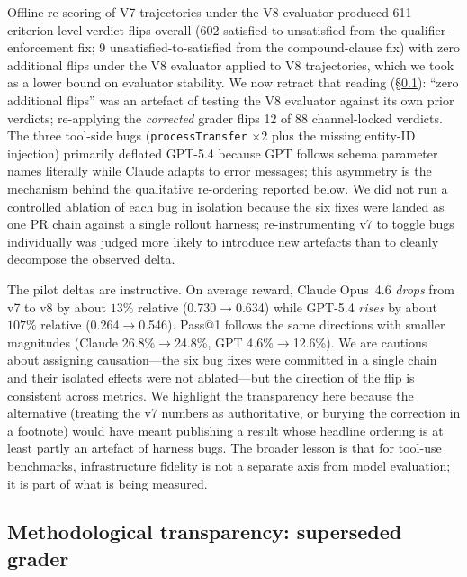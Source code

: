 Offline re-scoring of V7 trajectories under the V8 evaluator produced
611 criterion-level verdict flips overall (602 satisfied-to-unsatisfied
from the qualifier-enforcement fix; 9 unsatisfied-to-satisfied from
the compound-clause fix) with zero additional flips under the V8
evaluator applied to V8 trajectories, which we took as a lower bound
on evaluator stability. We now retract that reading
(\S\ref{sec:grader-superseded}): ``zero additional flips'' was an
artefact of testing the V8 evaluator against its own prior verdicts;
re-applying the \emph{corrected} grader flips 12 of 88 channel-locked
verdicts. The three tool-side bugs
(\texttt{processTransfer} $\times 2$ plus the missing
entity-ID injection) primarily deflated GPT-5.4 because GPT follows
schema parameter names literally while Claude adapts to error
messages; this asymmetry is the mechanism behind the qualitative
re-ordering reported below. We did not run a controlled ablation of
each bug in isolation because the six fixes were landed as one PR
chain against a single rollout harness; re-instrumenting v7 to
toggle bugs individually was judged more likely to introduce new
artefacts than to cleanly decompose the observed delta.

The pilot deltas are instructive. On average reward, Claude Opus~4.6
\emph{drops} from v7 to v8 by about $13\%$ relative  %
(0.730$\to$0.634) while GPT-5.4 \emph{rises} by about $107\%$ relative  %
(0.264$\to$0.546). Pass@1 follows the same directions with smaller
magnitudes (Claude 26.8\%$\to$24.8\%, GPT 4.6\%$\to$12.6\%). We are
cautious about assigning causation---the six bug fixes were committed
in a single chain and their isolated effects were not ablated---but the
direction of the flip is consistent across metrics. We highlight the
transparency here because the alternative (treating the v7 numbers as
authoritative, or burying the correction in a footnote) would have
meant publishing a result whose headline ordering is at least partly
an artefact of harness bugs. The broader lesson is that for tool-use
benchmarks, infrastructure fidelity is not a separate axis from model
evaluation; it is part of what is being measured.

\subsection{Methodological transparency: superseded grader}
\label{sec:grader-superseded}

